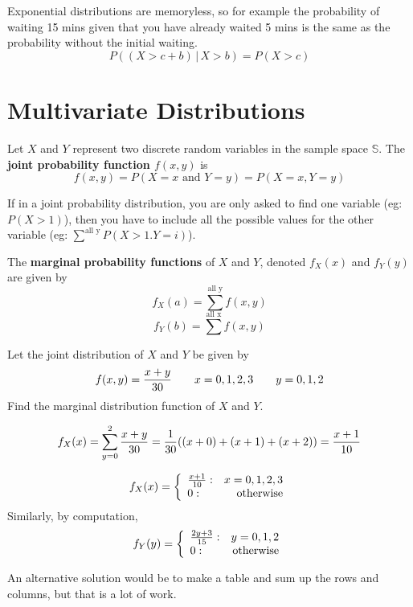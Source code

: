 \documentclass[english, 12pt]{article}
\begin{document}
\begin{note}
Exponential distributions are memoryless, so for example the probability of waiting 15 mins given that you have already waited 5 mins is the same as the probability without the initial waiting.
\[P((X > c + b)\,|\, X > b) = P(X > c)\]
\end{note}

\section{Multivariate Distributions}

\begin{defn}
Let $X$ and $Y$ represent two discrete random  variables in the sample space $\mathbb{S}$. The \textbf{joint probability function $f(x,y)$} is
\[f(x,y) = P(X = x \text{ and } Y = y) = P(X = x,Y = y)\]
\end{defn}

\begin{note}
If in a joint probability distribution, you are only asked to find one variable (eg: $P(X > 1)$), then you have to include all the possible values for the other variable (eg: $\sum^{\text{all y}} P(X > 1. Y = i)$).
\end{note}

\begin{defn}
The \textbf{marginal probability functions} of $X$ and $Y$, denoted $f_X(x)$ and $f_Y(y)$ are given by
\[f_X(a) = \sum^{\text{all y}} f(x,y)\]
\[f_Y(b) = \sum^{\text{all x}} f(x,y)\]
\end{defn}

\begin{exmp}
Let the joint distribution of $X$ and $Y$ be given by
\[f(x,y) = \frac{x + y}{30}\qquad x = 0,1,2,3 \qquad y = 0,1,2\]
Find the marginal distribution function of $X$ and $Y$.

\begin{sol}
\[f_X(x) = \sum_{y = 0}^2 \frac{x + y}{30} = \frac{1}{30}((x + 0) + (x + 1) + (x + 2)) = \frac{x+1}{10}\]

\begin{displaymath}
   f_X(x) = \left\{
     \begin{array}{lr}
       \frac{x+1}{10} : & x = 0,1,2,3 \\
       0 : & \text{otherwise}\\
     \end{array}
   \right.
\end{displaymath}
Similarly, by computation,
\begin{displaymath}
   f_Y(y) = \left\{
     \begin{array}{lr}
       \frac{2y+3}{15} : & y = 0,1,2 \\
       0 : & \text{otherwise}\\
     \end{array}
   \right.
\end{displaymath}

\begin{note}
An alternative solution would be to make a table and sum up the rows and columns, but that is a lot of work.
\end{note}
\end{sol}
\end{exmp}
\end{document}
